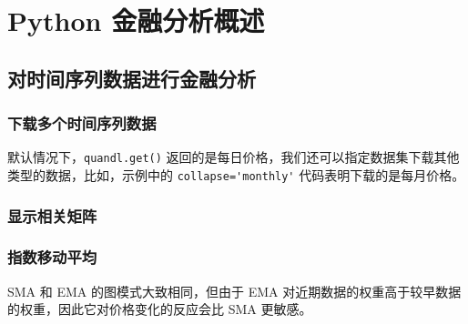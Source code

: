 \chapter{Python 金融分析概述}
\section{对时间序列数据进行金融分析}
\subsection{下载多个时间序列数据}
默认情况下，\verb|quandl.get()| 返回的是每日价格，我们还可以指定数据集下载其他类型的数据，比如，示例中的 \verb|collapse='monthly'| 代码表明下载的是每月价格。
\subsection{显示相关矩阵}
\subsection{指数移动平均}
SMA 和 EMA 的图模式大致相同，但由于 EMA 对近期数据的权重高于较早数据的权重，因此它对价格变化的反应会比 SMA 更敏感。
